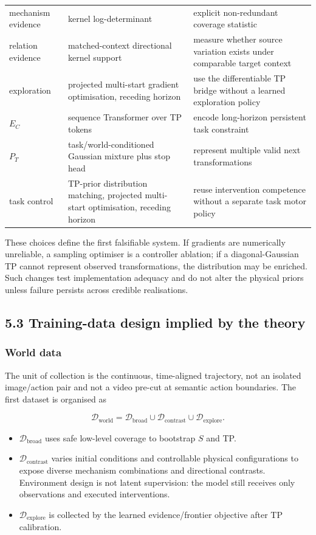 \documentclass[11pt]{article}
\begin{document}
\begin{center}
\begin{tabularx}{\textwidth}{@{}p{}p{}X@{}}
mechanism evidence & kernel log-determinant & explicit non-redundant coverage statistic \\
relation evidence & matched-context directional kernel support & measure whether source variation exists under comparable target context \\
exploration & projected multi-start gradient optimisation, receding horizon & use the differentiable TP bridge without a learned exploration policy \\
$E_C$ & sequence Transformer over TP tokens & encode long-horizon persistent task constraint \\
$P_T$ & task/world-conditioned Gaussian mixture plus stop head & represent multiple valid next transformations \\
task control & TP-prior distribution matching, projected multi-start optimisation, receding horizon & reuse intervention competence without a separate task motor policy \\
\bottomrule
\end{tabularx}
\end{center}

These choices define the first falsifiable system. If gradients are numerically unreliable, a sampling optimiser is a controller
ablation; if a diagonal-Gaussian TP cannot represent observed transformations, the distribution may be enriched. Such changes test
implementation adequacy and do not alter the physical priors unless failure persists across credible realisations.

\subsection*{5.3 Training-data design implied by the theory}

\subsubsection*{World data}

The unit of collection is the continuous, time-aligned trajectory, not an isolated image/action pair and not a video pre-cut at
semantic action boundaries. The first dataset is organised as

\[
\boxed{
\mathcal D_{\mathrm{world}}=
\mathcal D_{\mathrm{broad}}
\cup\mathcal D_{\mathrm{contrast}}
\cup\mathcal D_{\mathrm{explore}}.}
\]

\begin{itemize}
\item $\mathcal D_{\mathrm{broad}}$ uses safe low-level coverage to bootstrap $S$ and TP.
\item $\mathcal D_{\mathrm{contrast}}$ varies initial conditions and controllable physical configurations to expose diverse mechanism
combinations and directional contrasts. Environment design is not latent supervision: the model still receives only observations and
executed interventions.
\item $\mathcal D_{\mathrm{explore}}$ is collected by the learned evidence/frontier objective after TP calibration.
\end{itemize}
\end{document}

